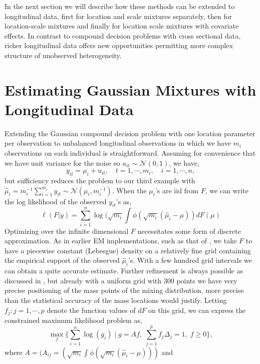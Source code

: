 \documentclass[12pt]{amsart}
\def\NN{\mathcal N}
\begin{document}
In the next section we will describe how these methods can be extended 
to longitudinal data, first for location and scale mixtures
separately, then for location-scale mixtures and finally for location
scale mixtures with covariate effects.  In contrast to compound 
decision problems with cross sectional data, richer longitudinal data 
offers new opportunities permitting more complex structure of  unobserved 
heterogeneity. 

\section{Estimating Gaussian Mixtures with Longitudinal Data}

Extending the Gaussian compound decision problem with one location parameter per
observation to unbalanced longitudinal observations in which we have $m_i$ 
observations on each individual is straightforward.  Assuming for convenience
that we have unit variance for the noise so $u_{it} \sim \NN(0,1)$, we have,
\[
y_{it} = \mu_i + u_{it}, \quad t = 1, \cdots , m_i, \quad i = 1, \cdots , n,
\]
but sufficiency reduces the problem to our third example with 
$\hat \mu_i = m_i^{-1} \sum_{i=1}^{m_i} y_{it} \sim \NN (\mu_i , m_i^{-1} )$.
When the $\mu_i$'s are iid from $F$, we can write the log likelihood of the
observed $y_{it}$'s as,
\[
\ell (F | y ) = \sum_{i=1}^n \log ( \sqrt{m_i} \int 
\phi( \sqrt{m_i} (\hat \mu_i - \mu)) dF(\mu)
\]
Optimizing over the infinite dimensional $F$ necessitates some form of discrete
approximation.  As in earlier EM implementations, such as that of ,
we take $F$ to have a piecewise constant (Lebesgue) density on a relatively fine
grid containing the empirical support of the observed $\hat \mu_i$'s.  With
a few hundred grid intervals we can obtain a quite accurate estimate.  Further
refinement is always possible as discussed in , but already with
a uniform grid with 300 points we have very precise positioning of the mass points
of the mixing distribution, more precise than the statistical accuracy of the mass
locations would justify.  Letting $f_j :
j = 1, \cdots , p$ denote the function values of $dF$ on this grid, we can express
the constrained maximum likelihood problem as,
\begin{equation}
	\max_f \{ \sum_{i=1}^n \log (g_i) \; | \; g = A f , \; 
	\sum_{j=1}^p f_j \Delta_j = 1, \; f \geq 0 \},
	\label{eq.PL}
\end{equation}
where $A = (A_{ij} = ( \sqrt{m_i} \int \phi( \sqrt{m_i} (\hat \mu_i - \mu)))$ and
\end{document}
